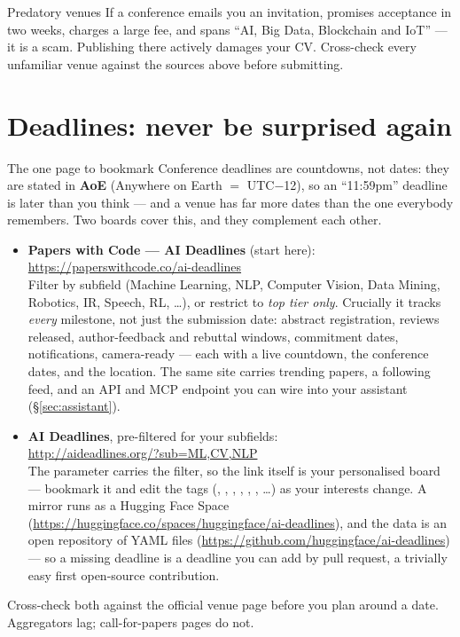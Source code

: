 \documentclass[11pt,a4paper]{article}
\begin{document}
\begin{wbox}{Predatory venues}
If a conference emails you an invitation, promises acceptance in two weeks,
charges a large fee, and spans ``AI, Big Data, Blockchain and IoT'' --- it is a
scam. Publishing there actively damages your CV. Cross-check every unfamiliar
venue against the sources above before submitting.
\end{wbox}

\section{Deadlines: never be surprised again}
\label{sec:deadlines}

\begin{cbox}{The one page to bookmark}
Conference deadlines are countdowns, not dates: they are stated in
\textbf{AoE} (Anywhere on Earth $=$ UTC$-$12), so an ``11:59pm'' deadline is
later than you think --- and a venue has far more dates than the one everybody
remembers. Two boards cover this, and they complement each other.

\begin{itemize}
  \item \textbf{Papers with Code --- AI Deadlines} (start here):\\
        \url{https://paperswithcode.co/ai-deadlines}\\
        Filter by subfield (Machine Learning, NLP,
        Computer Vision, Data Mining, Robotics, IR, Speech, RL, \ldots), or
        restrict to \emph{top tier only}. Crucially it tracks \emph{every}
        milestone, not just the submission date: abstract registration,
        reviews released, author-feedback and rebuttal windows, commitment
        dates, notifications, camera-ready --- each with a live countdown,
        the conference dates, and the location. The same site carries trending
        papers, a following feed, and an API and MCP endpoint you can wire
        into your assistant (\S\ref{sec:assistant}).
  \item \textbf{AI Deadlines}, pre-filtered for your subfields:\\
        \url{http://aideadlines.org/?sub=ML,CV,NLP}\\
        The  parameter carries the filter, so the link itself is
        your personalised board --- bookmark it and edit the tags
        (, , , , , ,
        \ldots) as your interests change. A mirror runs as a Hugging Face
        Space (\url{https://huggingface.co/spaces/huggingface/ai-deadlines}),
        and the data is an open repository of YAML files
        (\url{https://github.com/huggingface/ai-deadlines}) --- so a missing
        deadline is a deadline you can add by pull request, a trivially easy
        first open-source contribution.
\end{itemize}
Cross-check both against the official venue page before you plan around a
date. Aggregators lag; call-for-papers pages do not.
\end{cbox}
\end{document}
